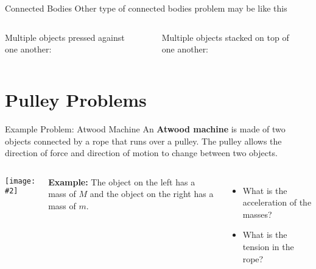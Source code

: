 \documentclass[12pt,compress,aspectratio=169]{beamer}
\newcommand{\pic}[2]{\texttt{[image: \#2]}}
\newcommand{\mb}[1]{\ensuremath\mathbf{#1}}
\begin{document}
\begin{frame}{Connected Bodies}
  Other type of connected bodies problem may be like this

  \vspace{.2in}
  \begin{columns}
    Multiple objects pressed against one another:
    \begin{center}
    \end{center}
    
    Multiple objects stacked on top of one another:
    \begin{center}
    \end{center}
  \end{columns}
\end{frame}


\section{Pulley Problems}

\begin{frame}{Example Problem: Atwood Machine}
  An \textbf{Atwood machine} is made of two objects connected by a rope that
  runs over a pulley. The pulley allows the direction of force and direction
  of motion to change between two objects.
  \begin{columns}
    \begin{center}
      \pic{1}{graphics/pulley_prob_2.png}
    \end{center}
    \textbf{Example:} The object on the left has a mass of $M$ and the object
    on the right has a mass of $m$.
    \begin{itemize}
    \item What is the acceleration of the masses?
    \item What is the tension in the rope?
    \end{itemize}
  \end{columns}
\end{frame}
\end{document}
